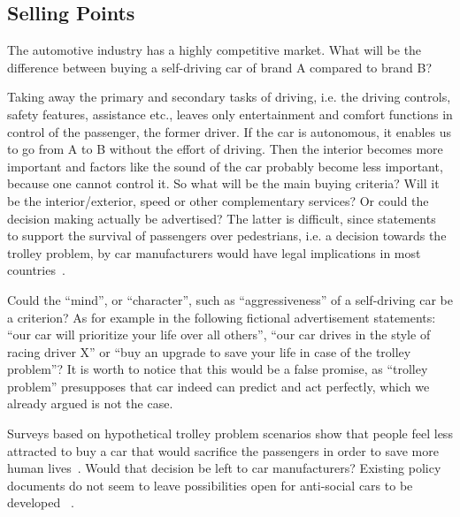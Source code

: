 \subsection{Selling Points}
\label{sec:EAofNONTC:SellingPoints}

The automotive industry has a highly competitive market. What will be the difference between buying a self-driving car of brand A compared to brand B? 

Taking away the primary and secondary tasks of driving, i.e. the driving controls, safety features, assistance etc., leaves only entertainment and comfort functions in control of the passenger, the former driver. If the car is autonomous, it enables us to go from A to B without the effort of driving. Then the interior becomes more important and factors like the sound of the car probably become less important, because one cannot control it. So what will be the main buying criteria? Will it be the interior/exterior, speed or other complementary services? Or could the decision making actually be advertised? The latter is difficult, since statements~\cite{CarAndDriverTaylor2016} to support the survival of passengers over pedestrians, i.e. a decision towards the trolley problem, by car manufacturers would have legal implications in most countries~\cite{Daimler2016pr}. 

Could the \enquote{mind}, or \enquote{character}, such as \enquote{aggressiveness} of a self-driving car be a criterion? As for example in the following fictional advertisement statements: \enquote{our car will prioritize your life over all others}, \enquote{our car drives in the style of racing driver X} or \enquote{buy an upgrade to save your life in case of the trolley problem}? It is worth to notice that this would be a false promise, as \enquote{trolley problem} presupposes that car indeed can predict and act perfectly, which we already argued is not the case.

Surveys based on hypothetical trolley problem scenarios show that people feel less attracted to buy a car that would sacrifice the passengers in order to save more human lives~\cite{Bonnefon2016}. Would that decision be left to car manufacturers? Existing policy documents do not seem to leave possibilities open for anti-social cars to be developed~ \cite{EthicsCommission2017pr,EthicsCommission2017b,Pillath2016,NHTSA2016PolicyUpdate,DBLP:journals/corr/CharisiDFLMSSWY17}.

